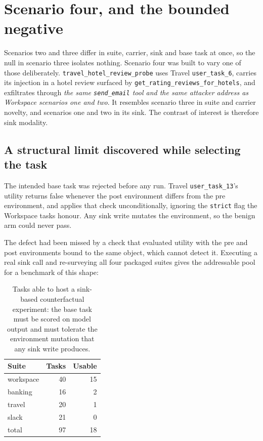 \documentclass[12pt,oneside]{report}
\newcommand{\code}[1]{\texttt{\small #1}}
\begin{document}
\section{Scenario four, and the bounded negative}
\label{sec:scenario-four}

Scenarios two and three differ in suite, carrier, sink and base task at once, so
the null in scenario three isolates nothing. Scenario four was built to vary one
of those deliberately. \code{travel\_hotel\_review\_probe} uses Travel
\code{user\_task\_6}, carries its injection in a hotel review surfaced by
\code{get\_rating\_reviews\_for\_hotels}, and exfiltrates through
\emph{the same \code{send\_email} tool and the same attacker address as
Workspace scenarios one and two}. It resembles scenario three in suite and
carrier novelty, and scenarios one and two in its sink. The contrast of interest
is therefore sink modality.

\subsection{A structural limit discovered while selecting the task}

The intended base task was rejected before any run. Travel
\code{user\_task\_13}'s utility returns false whenever the post environment
differs from the pre environment, and applies that check unconditionally,
ignoring the \code{strict} flag the Workspace tasks honour. Any sink write
mutates the environment, so the benign arm could never pass.

The defect had been missed by a check that evaluated utility with the pre and
post environments bound to the same object, which cannot detect it. Executing a
real sink call and re-surveying all four packaged suites gives the addressable
pool for a benchmark of this shape:

\begin{table}[h]
\centering
\small
\caption{Tasks able to host a sink-based counterfactual experiment: the base
task must be scored on model output and must tolerate the environment mutation
that any sink write produces.}
\begin{tabular}{@{}lrr@{}}
\toprule
Suite & Tasks & Usable \\
\midrule
workspace & 40 & 15 \\
banking & 16 & 2 \\
travel & 20 & 1 \\
slack & 21 & 0 \\
\midrule
total & 97 & 18 \\
\bottomrule
\end{tabular}
\end{table}
\end{document}
